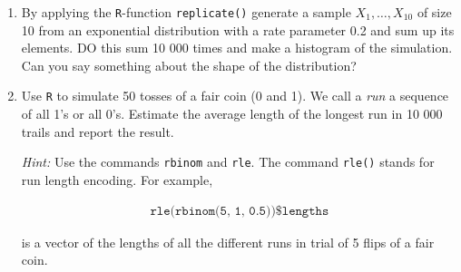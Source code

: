 
\begin{exercise}[Simulations]

\phantom{}

\begin{enumerate}[label = (\alph*)]
  \item By applying the \texttt{R}-function \texttt{replicate()} generate a sample
  $X_1,\dots,X_{10}$ of size 10 from an exponential distribution with a rate parameter 0.2
  and sum up its elements. DO this sum 10 000 times and make a histogram of the simulation.
  Can you say something about the shape of the distribution?
  \item Use \texttt{R} to simulate 50 tosses of a fair coin (0 and 1). We call
  a \textit{run} a sequence of all 1's or all 0's. Estimate the average length of the
  longest run in 10 000 trails and report the result.

  \textit{Hint:} Use the commands \texttt{rbinom} and \texttt{rle}. The command
  \texttt{rle()} stands for run length encoding. For example,

  \begin{align*}
    \texttt{rle(rbinom(5, 1, 0.5))\$ lengths}
  \end{align*}

  is a vector of the lengths of all the different runs in trial of 5 flips of a fair coin.
\end{enumerate}

\end{exercise}


\begin{solution}

\phantom{}

\end{solution}

